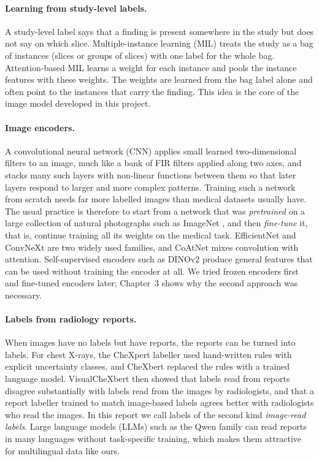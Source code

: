 \paragraph{Learning from study-level labels.} A study-level label says that a finding is present somewhere in the study but does not say on which slice. Multiple-instance learning (MIL) treats the study as a bag of instances (slices or groups of slices) with one label for the whole bag. Attention-based MIL \cite{ilse2018} learns a weight for each instance and pools the instance features with these weights. The weights are learned from the bag label alone and often point to the instances that carry the finding. This idea is the core of the image model developed in this project.

\paragraph{Image encoders.} A convolutional neural network (CNN) applies small learned two-dimensional filters to an image, much like a bank of FIR filters applied along two axes, and stacks many such layers with non-linear functions between them so that later layers respond to larger and more complex patterns. Training such a network from scratch needs far more labelled images than medical datasets usually have. The usual practice is therefore to start from a network that was \emph{pretrained} on a large collection of natural photographs such as ImageNet \cite{deng2009imagenet}, and then \emph{fine-tune} it, that is, continue training all its weights on the medical task. EfficientNet \cite{tan2019effnet,tan2021effnetv2} and ConvNeXt \cite{liu2022convnext} are two widely used families, and CoAtNet \cite{dai2021coatnet} mixes convolution with attention. Self-supervised encoders such as DINOv2 \cite{oquab2024dinov2} produce general features that can be used without training the encoder at all. We tried frozen encoders first and fine-tuned encoders later; Chapter~3 shows why the second approach was necessary.

\paragraph{Labels from radiology reports.} When images have no labels but have reports, the reports can be turned into labels. For chest X-rays, the CheXpert labeller \cite{irvin2019chexpert} used hand-written rules with explicit uncertainty classes, and CheXbert \cite{smit2020chexbert} replaced the rules with a trained language model. VisualCheXbert \cite{jain2021visualchexbert} then showed that labels read from reports disagree substantially with labels read from the images by radiologists, and that a report labeller trained to match image-based labels agrees better with radiologists who read the images. In this report we call labels of the second kind \emph{image-read labels}. Large language models (LLMs) such as the Qwen family \cite{qwen2025qwen25,yang2025qwen3} can read reports in many languages without task-specific training, which makes them attractive for multilingual data like ours.

